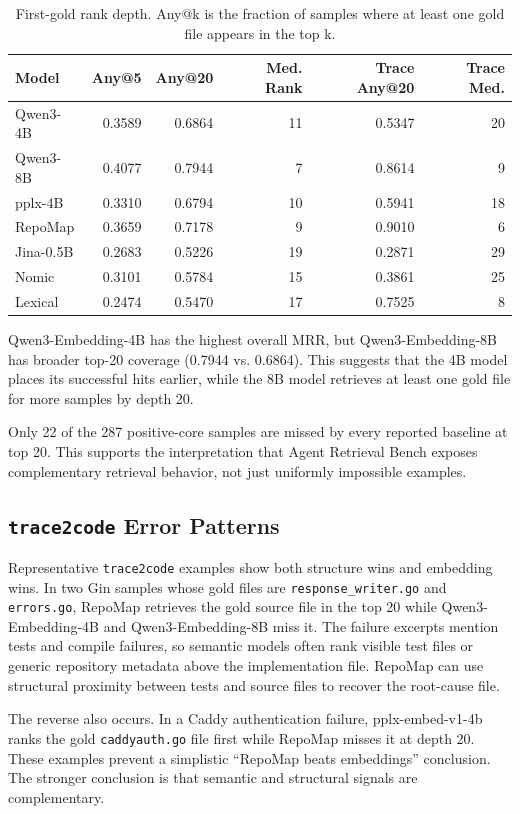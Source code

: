 \documentclass[11pt]{article}
\newcommand{\arb}{Agent Retrieval Bench}
\newcommand{\code}[1]{\texttt{#1}}
\begin{document}
\begin{table}[t]
\centering
\caption{First-gold rank depth. Any@k is the fraction of samples where at least one gold file appears in the top k.}
\label{tab:first-gold-depth}
\begin{tabular}{lrrrrr}
\toprule
Model & Any@5 & Any@20 & Med. Rank & Trace Any@20 & Trace Med. \\
\midrule
Qwen3-4B & 0.3589 & 0.6864 & 11 & 0.5347 & 20 \\
Qwen3-8B & 0.4077 & 0.7944 & 7 & 0.8614 & 9 \\
pplx-4B & 0.3310 & 0.6794 & 10 & 0.5941 & 18 \\
RepoMap & 0.3659 & 0.7178 & 9 & 0.9010 & 6 \\
Jina-0.5B & 0.2683 & 0.5226 & 19 & 0.2871 & 29 \\
Nomic & 0.3101 & 0.5784 & 15 & 0.3861 & 25 \\
Lexical & 0.2474 & 0.5470 & 17 & 0.7525 & 8 \\
\bottomrule
\end{tabular}
\end{table}

Qwen3-Embedding-4B has the highest overall MRR, but Qwen3-Embedding-8B has broader top-20 coverage (0.7944 vs. 0.6864). This suggests that the 4B model places its successful hits earlier, while the 8B model retrieves at least one gold file for more samples by depth 20.

Only 22 of the 287 positive-core samples are missed by every reported baseline at top 20. This supports the interpretation that \arb{} exposes complementary retrieval behavior, not just uniformly impossible examples.

\subsection{\code{trace2code} Error Patterns}

Representative \code{trace2code} examples show both structure wins and embedding wins. In two Gin samples whose gold files are \code{response\_writer.go} and \code{errors.go}, RepoMap retrieves the gold source file in the top 20 while Qwen3-Embedding-4B and Qwen3-Embedding-8B miss it. The failure excerpts mention tests and compile failures, so semantic models often rank visible test files or generic repository metadata above the implementation file. RepoMap can use structural proximity between tests and source files to recover the root-cause file.

The reverse also occurs. In a Caddy authentication failure, pplx-embed-v1-4b ranks the gold \code{caddyauth.go} file first while RepoMap misses it at depth 20. These examples prevent a simplistic ``RepoMap beats embeddings'' conclusion. The stronger conclusion is that semantic and structural signals are complementary.
\end{document}
